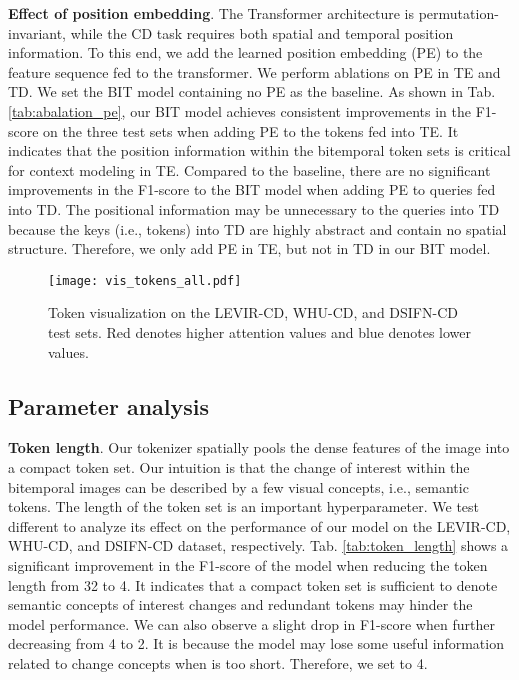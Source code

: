 \documentclass[journal]{IEEEtran}
\begin{document}
\textbf{Effect of position embedding}. The Transformer architecture is permutation-invariant, while the CD task requires both spatial and temporal position information. To this end, we add the learned position embedding (PE) to the feature sequence fed to the transformer. We perform ablations on PE in TE and TD. We set the BIT model containing no PE as the baseline. As shown in Tab. \ref{tab:abalation_pe}, our BIT model achieves consistent improvements in the F1-score on the three test sets when adding PE to the tokens fed into TE. It indicates that the position information within the bitemporal token sets is critical for context modeling in TE. Compared to the baseline, there are no significant improvements in the F1-score to the BIT model when adding PE to queries fed into TD. The positional information may be unnecessary to the queries into TD because the keys (i.e., tokens) into TD are highly abstract and contain no spatial structure. Therefore, we only add PE in TE, but not in TD in our BIT model. 

\begin{figure}
    \centering
    \texttt{[image: vis\_tokens\_all.pdf]}
    \caption{Token visualization on the LEVIR-CD, WHU-CD, and DSIFN-CD test sets. Red denotes higher attention values and blue denotes lower values.}
    \label{fig:visulize_tokens_all}
\end{figure}

\subsection{Parameter analysis} \label{parameter_analysis}

\textbf{Token length}. Our tokenizer spatially pools the dense features of the image into a compact token set. Our intuition is that the change of interest within the bitemporal images can be described by a few visual concepts, i.e., semantic tokens. The length of the token set  is an important hyperparameter. We test different  to analyze its effect on the performance of our model on the LEVIR-CD, WHU-CD, and DSIFN-CD dataset, respectively. Tab. \ref{tab:token_length} shows a significant improvement in the F1-score of the model when reducing the token length from 32 to 4. It indicates that a compact token set is sufficient to denote semantic concepts of interest changes and redundant tokens may hinder the model performance. We can also observe a slight drop in F1-score when further decreasing  from 4 to 2. It is because the model may lose some useful information related to change concepts when  is too short. Therefore, we set  to 4. 
\end{document}
